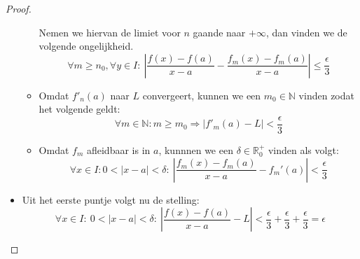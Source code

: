 \documentclass[main.tex]{subfiles}
\begin{document}
\begin{st}
\begin{proof}
\begin{itemize}
\begin{itemize}
        Nemen we hiervan de limiet voor $n$ gaande naar $+\infty$, dan vinden we de volgende ongelijkheid.
        \[ \forall m \ge n_{0},\forall y\in I:\ \left| \frac{f(x)-f(a)}{x-a} - \frac{f_{m}(x)-f_{m}(a)}{x-a}\right| \le \frac{\epsilon}{3} \]
      \item 
        Omdat $f'_{n}(a)$ naar $L$ convergeert, kunnen we een $m_{0} \in \mathbb{N}$ vinden zodat het volgende geldt:
        \[ \forall m\in \mathbb{N}: m \ge m_{0} \Rightarrow \left| f'_{m}(a) - L \right| < \frac{\epsilon}{3}\]
      \item 
        Omdat $f_{m}$ afleidbaar is in $a$, kunnnen we een $\delta \in \mathbb{R}_{0}^{+}$ vinden  als volgt:
        \[ \forall x\in I: 0 < |x-a| < \delta:\ \left| \frac{f_{m}(x)-f_{m}(a)}{x-a} - f_{m}'(a) \right| < \frac{\epsilon}{3} \]
      \end{itemize}
    \item Uit het eerste puntje volgt nu de stelling:
      \[ \forall x\in I:\ 0 < |x-a| < \delta:\ \left| \frac{f(x)-f(a)}{x-a} - L \right|  < \frac{\epsilon}{3}+\frac{\epsilon}{3} +\frac{\epsilon}{3} = \epsilon \]
    \end{itemize}
  \end{proof}
\end{st}
\end{document}
